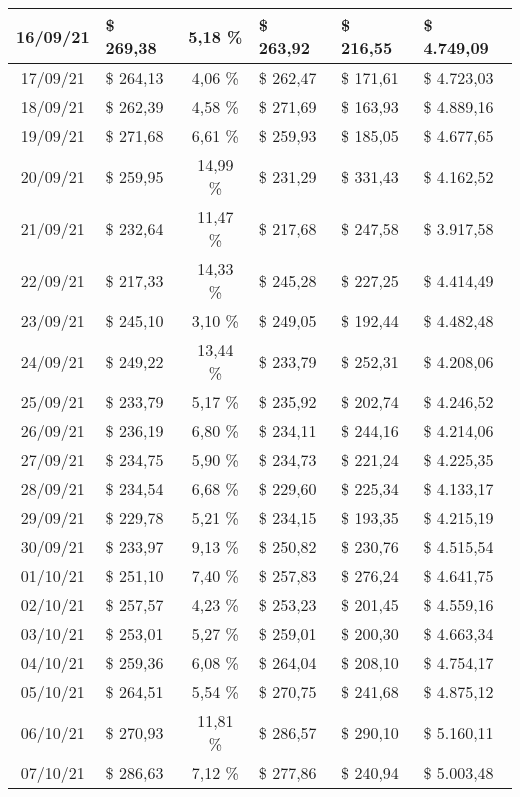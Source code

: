 \begin{center}
\begin{small}
\begin{longtable}{|c|l|c|l|l|l|}
16/09/21 & \$ 269,38 & 5,18 \% & \$ 263,92 & \$ 216,55 & \$ 4.749,09 \\ \hline
17/09/21 & \$ 264,13 & 4,06 \% & \$ 262,47 & \$ 171,61 & \$ 4.723,03 \\ \hline
18/09/21 & \$ 262,39 & 4,58 \% & \$ 271,69 & \$ 163,93 & \$ 4.889,16 \\ \hline
19/09/21 & \$ 271,68 & 6,61 \% & \$ 259,93 & \$ 185,05 & \$ 4.677,65 \\ \hline
20/09/21 & \$ 259,95 & 14,99 \% & \$ 231,29 & \$ 331,43 & \$ 4.162,52 \\ \hline
21/09/21 & \$ 232,64 & 11,47 \% & \$ 217,68 & \$ 247,58 & \$ 3.917,58 \\ \hline
22/09/21 & \$ 217,33 & 14,33 \% & \$ 245,28 & \$ 227,25 & \$ 4.414,49 \\ \hline
23/09/21 & \$ 245,10 & 3,10 \% & \$ 249,05 & \$ 192,44 & \$ 4.482,48 \\ \hline
24/09/21 & \$ 249,22 & 13,44 \% & \$ 233,79 & \$ 252,31 & \$ 4.208,06 \\ \hline
25/09/21 & \$ 233,79 & 5,17 \% & \$ 235,92 & \$ 202,74 & \$ 4.246,52 \\ \hline
26/09/21 & \$ 236,19 & 6,80 \% & \$ 234,11 & \$ 244,16 & \$ 4.214,06 \\ \hline
27/09/21 & \$ 234,75 & 5,90 \% & \$ 234,73 & \$ 221,24 & \$ 4.225,35 \\ \hline
28/09/21 & \$ 234,54 & 6,68 \% & \$ 229,60 & \$ 225,34 & \$ 4.133,17 \\ \hline
29/09/21 & \$ 229,78 & 5,21 \% & \$ 234,15 & \$ 193,35 & \$ 4.215,19 \\ \hline
30/09/21 & \$ 233,97 & 9,13 \% & \$ 250,82 & \$ 230,76 & \$ 4.515,54 \\ \hline
01/10/21 & \$ 251,10 & 7,40 \% & \$ 257,83 & \$ 276,24 & \$ 4.641,75 \\ \hline
02/10/21 & \$ 257,57 & 4,23 \% & \$ 253,23 & \$ 201,45 & \$ 4.559,16 \\ \hline
03/10/21 & \$ 253,01 & 5,27 \% & \$ 259,01 & \$ 200,30 & \$ 4.663,34 \\ \hline
04/10/21 & \$ 259,36 & 6,08 \% & \$ 264,04 & \$ 208,10 & \$ 4.754,17 \\ \hline
05/10/21 & \$ 264,51 & 5,54 \% & \$ 270,75 & \$ 241,68 & \$ 4.875,12 \\ \hline
06/10/21 & \$ 270,93 & 11,81 \% & \$ 286,57 & \$ 290,10 & \$ 5.160,11 \\ \hline
07/10/21 & \$ 286,63 & 7,12 \% & \$ 277,86 & \$ 240,94 & \$ 5.003,48 \\ \hline

\end{longtable}
\end{small}
\end{center}
